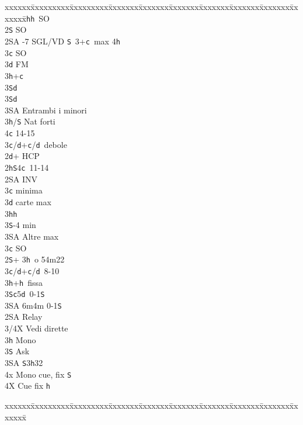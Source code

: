 \documentclass[a4paper,italian]{article}
\newcommand{\BS}{\small{\texttt{S}}}
\newcommand{\BC}{\small{\texttt{c}}}
\newcommand{\BD}{\small{\texttt{d}}}
\newcommand{\BH}{\small{\texttt{h}}}
\newenvironment{bidtable}
{\begin{tabbing}

    xxxxxx\=xxxxxxxxx\=xxxxxxxxx\=xxxxxxx\=xxxxxxx\=xxxxxxx\=xxxxxxx\=xxxxxxx\=xxxxxxx\=xxxxxxx\=\kill}
{\end{tabbing} }%
\begin{document}
\begin{multicols}{2}
    \begin{bidtable}
        2\BH {}\BH\ SO\\
        2\BS \> SO\\
        2\small{SA} -7 SGL/VD \BS\ 3+\BC\ max 4\BH \+\\
        3\BC \> SO\\
        3\BD \> FM\+\\
        3\BH {}+\BC \+\\
        3\BS {}\BD \-\\
        3\BS {}\BD \\
        3\small{SA} \> Entrambi i minori\-\\
        3\BH/\BS \> Nat forti\\
        4\BC {} 14-15\-\\
        3\BC/\BD {}+\BC /\BD\ debole\\
        2\BD {}+ HCP\+\\
        2\BH {}\BS 4\BC\ 11-14\+\\
        2\small{SA} \> INV\+\\
        3\BC {} minima\\
        3\BD {} carte max\\
        3\BH {}\BH \\
        3\BS {}-4 min\\
        3\small{SA} \> Altre max\-\\
        3\BC \> SO\-\\
        2\BS {}+ 3\BH\ o 54m22\+\\
        3\BC/\BD {}+\BC /\BD\ 8-10\\
        3\BH {}+\BH\ fissa\\
        3\BS {}\BC 5\BD\ 0-1\BS \\
        3\small{SA} \> 6m4m 0-1\BS \\
        2\small{SA} \> Relay\+\\
        3/4X \> Vedi dirette\\
        3\BH \> Mono\+\\
        3\BS \> Ask\+\\
        3\small{SA} \BS 3\BH 32\\
        4x \> Mono cue, fix \BS\-\\
        4X \> Cue fix \BH \-\-\-\\
    \end{bidtable}
    \columnbreak
    \begin{bidtable}
        \+\\

\end{bidtable}
\end{multicols}
\end{document}
